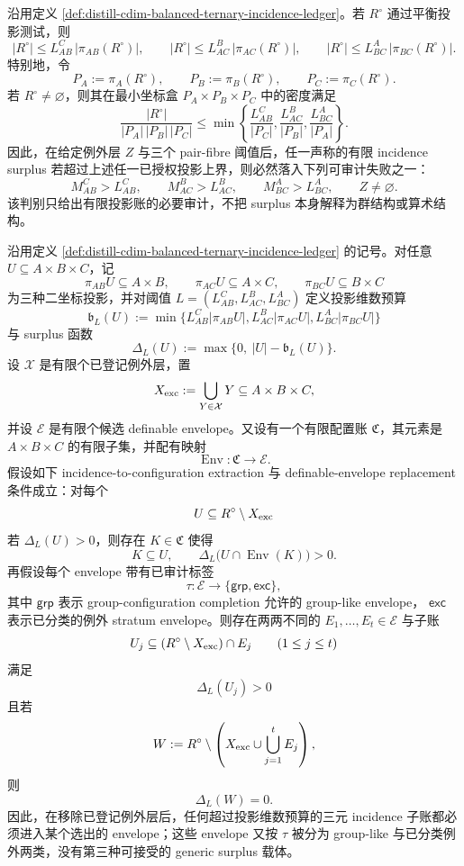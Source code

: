 \begin{proposition}\label{prop:distill-cdim-balanced-ternary-incidence-audit}
沿用定义 \ref{def:distill-cdim-balanced-ternary-incidence-ledger}。若 \(R^\circ\) 通过平衡投影测试，则
\[
|R^\circ|\le L_{AB}^{C}\,|\pi_{AB}(R^\circ)|,\qquad
|R^\circ|\le L_{AC}^{B}\,|\pi_{AC}(R^\circ)|,\qquad
|R^\circ|\le L_{BC}^{A}\,|\pi_{BC}(R^\circ)|.
\]
特别地，令
\[
P_A:=\pi_A(R^\circ),\qquad P_B:=\pi_B(R^\circ),\qquad P_C:=\pi_C(R^\circ).
\]
若 \(R^\circ\ne\varnothing\)，则其在最小坐标盒 \(P_A\times P_B\times P_C\) 中的密度满足
\[
\frac{|R^\circ|}{|P_A|\,|P_B|\,|P_C|}
\le
\min\left\{
\frac{L_{AB}^{C}}{|P_C|},
\frac{L_{AC}^{B}}{|P_B|},
\frac{L_{BC}^{A}}{|P_A|}
\right\}.
\]
因此，在给定例外层 \(Z\) 与三个 pair-fibre 阈值后，任一声称的有限 incidence surplus 若超过上述任一已授权投影上界，则必然落入下列可审计失败之一：
\[
M_{AB}^{C}>L_{AB}^{C},\qquad
M_{AC}^{B}>L_{AC}^{B},\qquad
M_{BC}^{A}>L_{BC}^{A},\qquad
Z\ne\varnothing.
\]
该判别只给出有限投影账的必要审计，不把 surplus 本身解释为群结构或算术结构。
\end{proposition}
\begin{theorem}\label{distill:hrushovski_zilber_zariski_geometries_and_elekes_szabo_group_extraction-incidence_surplus_forces_algebraic_explanation-finite-ternary-envelope-exception-normal-form}
沿用定义 \ref{def:distill-cdim-balanced-ternary-incidence-ledger} 的记号。对任意
\(U\subseteq A\times B\times C\)，记
\[
\pi_{AB}U\subseteq A\times B,\qquad
\pi_{AC}U\subseteq A\times C,\qquad
\pi_{BC}U\subseteq B\times C
\]
为三种二坐标投影，并对阈值
\(L=(L_{AB}^{C},L_{AC}^{B},L_{BC}^{A})\) 定义投影维数预算
\[
\mathfrak b_L(U):=\min\{L_{AB}^{C}|\pi_{AB}U|,
L_{AC}^{B}|\pi_{AC}U|,
L_{BC}^{A}|\pi_{BC}U|\}
\]
与 surplus 函数
\[
\Delta_L(U):=\max\{0,\ |U|-\mathfrak b_L(U)\}.
\]
设 \(\mathcal X\) 是有限个已登记例外层，置
\[
X_{\rm exc}:=\bigcup_{Y\in\mathcal X}Y\subseteq A\times B\times C,
\]
并设 \(\mathcal E\) 是有限个候选 definable envelope。又设有一个有限配置账
\(\mathfrak C\)，其元素是 \(A\times B\times C\) 的有限子集，并配有映射
\[
\operatorname{Env}:\mathfrak C\longrightarrow \mathcal E.
\]
假设如下 incidence-to-configuration extraction 与 definable-envelope replacement 条件成立：对每个
\[
U\subseteq R^\circ\setminus X_{\rm exc}
\]
若 \(\Delta_L(U)>0\)，则存在 \(K\in\mathfrak C\) 使得
\[
K\subseteq U,\qquad \Delta_L\bigl(U\cap \operatorname{Env}(K)\bigr)>0.
\]
再假设每个 envelope 带有已审计标签
\[
\tau:\mathcal E\longrightarrow \{\mathsf{grp},\mathsf{exc}\},
\]
其中 \(\mathsf{grp}\) 表示 group-configuration completion 允许的 group-like envelope，
\(\mathsf{exc}\) 表示已分类的例外 stratum envelope。则存在两两不同的
\(E_1,
\ldots,E_t\in\mathcal E\) 与子账
\[
U_j\subseteq (R^\circ\setminus X_{\rm exc})\cap E_j\qquad(1\le j\le t)
\]
满足
\[
\Delta_L(U_j)>0
\]
且若
\[
W:=R^\circ\setminus \left(X_{\rm exc}\cup\bigcup_{j=1}^t E_j\right),
\]
则
\[
\Delta_L(W)=0.
\]
因此，在移除已登记例外层后，任何超过投影维数预算的三元 incidence 子账都必须进入某个选出的 envelope；这些 envelope 又按 \(\tau\) 被分为 group-like 与已分类例外两类，没有第三种可接受的 generic surplus 载体。
\end{theorem}

